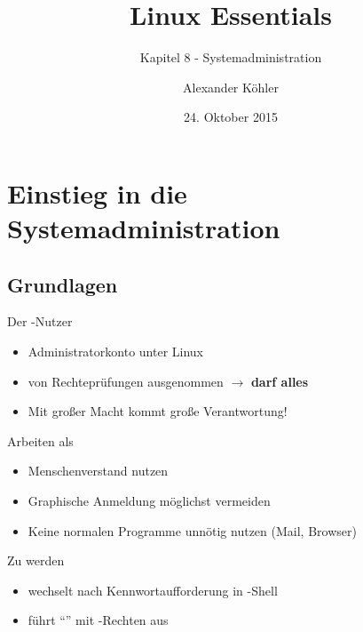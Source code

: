 \documentclass[aspectratio=43]{beamer}
\title[Linux Essentials  - Kapitel 8 - Systemadministration]{Linux Essentials}
\subtitle{Kapitel 8 - Systemadministration}
\author{Alexander Köhler}
\date{24. Oktober 2015}
\begin{document}
\logoframe

\frame{\titlepage}

\setcounter{tocdepth}{1}
\section[Gliederung]{}
\frame{\tableofcontents}


\section{Einstieg in die Systemadministration}
\subsection{Grundlagen}
\begin{frame}{}
  \begin{block}{Der -Nutzer}
    \begin{itemize}
      \item Administratorkonto unter Linux
      \item von Rechteprüfungen ausgenommen
      $\rightarrow$ \textbf{darf alles}
      \item Mit großer Macht kommt große Verantwortung!
    \end{itemize}
  \end{block}

  \begin{block}{Arbeiten als }
    \begin{itemize}
      \item Menschenverstand nutzen
      \item Graphische Anmeldung möglichst vermeiden
      \item Keine normalen Programme unnötig nutzen (Mail, Browser)
    \end{itemize}
  \end{block}
    \begin{alertblock}{Zu  werden}
    \begin{itemize}
      \item {} wechselt nach Kennwortaufforderung in  -Shell
      \item {} führt "`"' mit -Rechten aus
    \end{itemize}
  \end{alertblock}
\end{frame}
\end{document}
